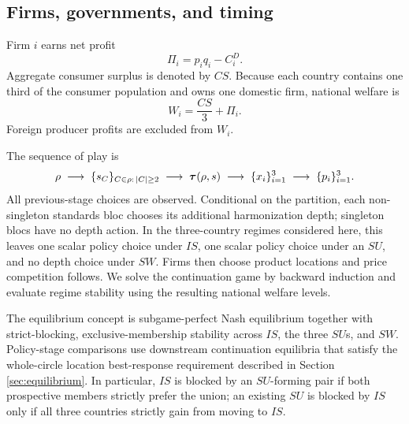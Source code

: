 \subsection{Firms, governments, and timing}

Firm $i$ earns net profit
\begin{equation}\label{eq:profit}
\Pi_i=p_iq_i-C_i^D.
\end{equation}
Aggregate consumer surplus is denoted by $CS$. Because each country contains one third of the consumer population and owns one domestic firm, national welfare is
\begin{equation}\label{eq:national-welfare}
W_i=\frac{CS}{3}+\Pi_i.
\end{equation}
Foreign producer profits are excluded from $W_i$.

The sequence of play is
\[
\rho
\;\longrightarrow\;
\{s_C\}_{C\in\rho:\,|C|\geq2}
\;\longrightarrow\;
\boldsymbol{\tau}(\rho,s)
\;\longrightarrow\;
\{x_i\}_{i=1}^3
\;\longrightarrow\;
\{p_i\}_{i=1}^3.
\]
All previous-stage choices are observed. Conditional on the partition, each non-singleton standards bloc chooses its additional harmonization depth; singleton blocs have no depth action. In the three-country regimes considered here, this leaves one scalar policy choice under $IS$, one scalar policy choice under an $SU$, and no depth choice under $SW$. Firms then choose product locations and price competition follows. We solve the continuation game by backward induction and evaluate regime stability using the resulting national welfare levels.

The equilibrium concept is subgame-perfect Nash equilibrium together with strict-blocking, exclusive-membership stability across $IS$, the three $SU$s, and $SW$. Policy-stage comparisons use downstream continuation equilibria that satisfy the whole-circle location best-response requirement described in Section \ref{sec:equilibrium}. In particular, $IS$ is blocked by an $SU$-forming pair if both prospective members strictly prefer the union; an existing $SU$ is blocked by $IS$ only if all three countries strictly gain from moving to $IS$.